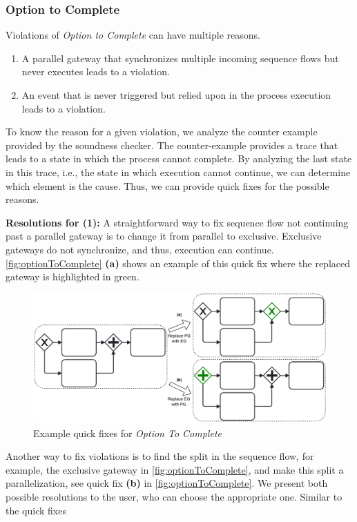 \documentclass[runningheads]{llncs}
\begin{document}
\subsubsection{Option to Complete} \label{subsec:optionToComplete}
Violations of \textit{Option to Complete} can have multiple reasons.

\begin{enumerate}
	\item A parallel gateway that synchronizes multiple incoming sequence flows but never executes leads to a violation.
	\item An event that is never triggered but relied upon in the process execution leads to a violation.
\end{enumerate}

To know the reason for a given violation, we analyze the counter example provided by the soundness checker.
The counter-example provides a trace that leads to a state in which the process cannot complete.
By analyzing the last state in this trace, i.e., the state in which execution cannot continue, we can determine which element is the cause.
Thus, we can provide quick fixes for the possible reasons.

\textbf{Resolutions for (1):} A straightforward way to fix sequence flow not continuing past a parallel gateway is to change it from parallel to exclusive.
Exclusive gateways do not synchronize, and thus, execution can continue.
\autoref{fig:optionToComplete} \textbf{(a)} shows an example of this quick fix where the replaced gateway is highlighted in green.

\begin{figure}[ht]
	\centering
	\includegraphics[width=1\textwidth]{images/optionToComplete}
	\caption{Example quick fixes for \textit{Option To Complete}}
	\label{fig:optionToComplete}
\end{figure}

Another way to fix violations is to find the split in the sequence flow, for example, the exclusive gateway in \autoref{fig:optionToComplete}, and make this split a parallelization, see quick fix \textbf{(b)} in \autoref{fig:optionToComplete}.
We present both possible resolutions to the user, who can choose the appropriate one.
Similar to the quick fixes
\end{document}

